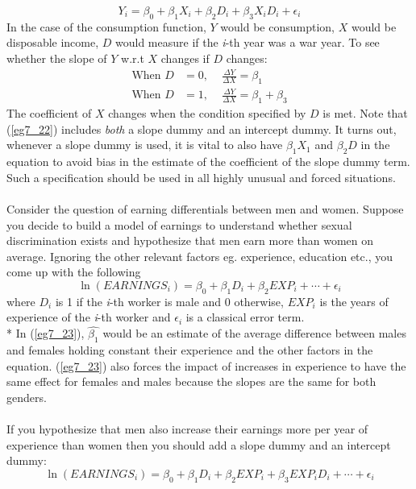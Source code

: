 \documentclass[11pt]{article}
\begin{document}
\begin{equation}
Y_i = \beta_0 + \beta_1X_i + \beta_2D_i + \beta_3X_iD_i + \epsilon_i \label{eg7_22}
\end{equation}
In the case of the consumption function, $Y$ would be consumption, $X$ would be disposable income, $D$ would measure if the \textit{i}-th year was a war year. To see whether the slope of $Y$ w.r.t $X$ changes if $D$ changes:
\begin{align*}
\text{When } D&=0 \text{, }\quad \frac{\Delta Y}{\Delta X} = \beta_1\\
\text{When } D&=1 \text{, }\quad \frac{\Delta Y}{\Delta X} = \beta_1 + \beta_3
\end{align*}
The coefficient of $X$ changes when the condition specified by $D$ is met. Note that (\ref{eg7_22}) includes \textit{both} a slope dummy and an intercept dummy. It turns out, whenever a slope dummy is used, it is vital to also have $\beta_1X_1$ and $\beta_2D$ in the equation to avoid bias in the estimate of the coefficient of the slope dummy term. Such a specification should be used in all highly unusual and forced situations. \\ \\
Consider the question of earning differentials between men and women. Suppose you decide to build a model of earnings to understand whether sexual discrimination exists and hypothesize that men earn more than women on average. Ignoring the other relevant factors eg. experience, education etc., you come up with the following
\begin{equation}
\ln (EARNINGS_i) = \beta_0 + \beta_1D_i + \beta_2EXP_i + \cdots + \epsilon_i \label{eg7_23}
\end{equation}
where $D_i$ is 1 if the \textit{i}-th worker is male and 0 otherwise, $EXP_i$ is the years of experience of the \textit{i}-th worker and $\epsilon_i$ is a classical error term.\\*
In (\ref{eg7_23}), $\hat{\beta_1}$ would be an estimate of the average difference between males and females holding constant their experience and the other factors in the equation. (\ref{eg7_23}) also forces the impact of increases in experience to have the same effect for females and males because the slopes are the same for both genders.\\ \\
If you hypothesize that men also increase their earnings more per year of experience than women then you should add a slope dummy and an intercept dummy:
\begin{equation}
\ln (EARNINGS_i) = \beta_0 + \beta_1D_i + \beta_2EXP_i + \beta_3EXP_iD_i +\cdots + \epsilon_i \label{eg7_24}
\end{equation}
\end{document}
